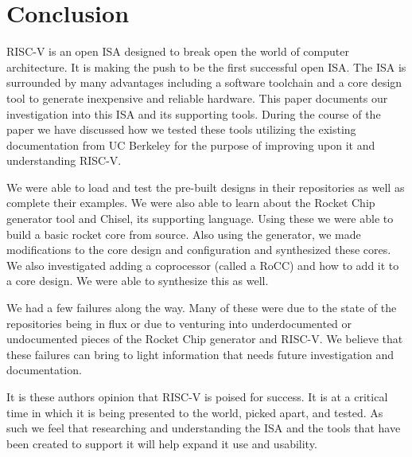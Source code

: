 \documentclass[]{IEEEtran}
\begin{document}

\section{Conclusion}
RISC-V is an open ISA designed to break open the world of computer architecture. It is making the push to be the first successful open ISA. The ISA is surrounded by many advantages including a software toolchain and a core design tool to generate inexpensive and reliable hardware. This paper documents our investigation into this ISA and its supporting tools. During the course of the paper we have discussed how we tested these tools utilizing the existing documentation from UC Berkeley for the purpose of improving upon it and understanding RISC-V.

We were able to load and test the pre-built designs in their repositories as well as complete their examples. We were also able to learn about the Rocket Chip generator tool and Chisel, its supporting language. Using these we were able to build a basic rocket core from source. Also using the generator, we made modifications to the core design and configuration and synthesized these cores. We also investigated adding a coprocessor (called a RoCC) and how to add it to a core design. We were able to synthesize this as well. 

We had a few failures along the way. Many of these were due to the state of the repositories being in flux or due to venturing into underdocumented or undocumented pieces of the Rocket Chip generator and RISC-V. We believe that these failures can bring to light information that needs future investigation and documentation. 

It is these authors opinion that RISC-V is poised for success. It is at a critical time in which it is being presented to the world, picked apart, and tested. As such we feel that researching and understanding the ISA and the tools that have been created to support it will help expand it use and usability.
\end{document}
